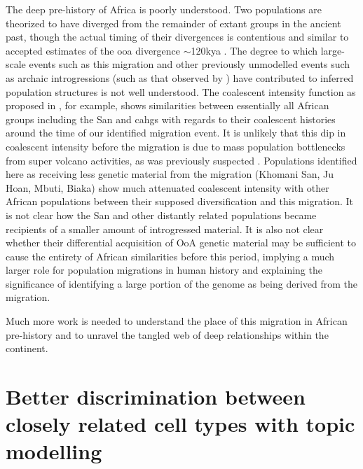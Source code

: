 The deep pre-history of Africa is poorly understood. Two populations are theorized to have diverged from the remainder of extant groups in the ancient past, though the actual timing of their divergences is contentious and similar to accepted estimates of the \gls{ooa} divergence $\sim$120kya \cite{Lipson2019}. The degree to which large-scale events such as this migration and other previously unmodelled events such as archaic introgressions (such as that observed by \textcite{Durvasula2019}) have contributed to inferred population structures is not well understood. The coalescent intensity function as proposed in \textcite{Albers2019}, for example, shows similarities between essentially all African groups including the San and \glspl{cahg} with regards to their coalescent histories around the time of our identified migration event. It is unlikely that this dip in coalescent intensity before the migration is due to mass population bottlenecks from super volcano activities, as was previously suspected \cite{Smith2018}. Populations identified here as receiving less genetic material from the migration (Khomani San, Ju Hoan, Mbuti, Biaka) show much attenuated coalescent intensity with other African populations between their supposed diversification and this migration. It is not clear how the San and other distantly related populations became recipients of a smaller amount of introgressed material. It is also not clear whether their differential acquisition of OoA genetic material may be sufficient to cause the entirety of African similarities before this period, implying a much larger role for population migrations in human history and explaining the significance of identifying a large portion of the genome as being derived from the migration. 

Much more work is needed to understand the place of this migration in African pre-history and to unravel the tangled web of deep relationships within the continent. 

\section{Better discrimination between closely related cell types with topic modelling}

